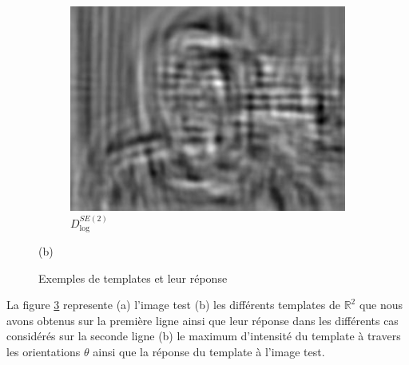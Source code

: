 \documentclass{article}
\begin{document}
\begin{figure}[h!]
\begin{subfigure}[b]{0.1\textwidth}
        \label{fig:mean and std of net44}
    \end{subfigure}
    \hspace{-1\baselineskip}
    \quad
    \begin{subfigure}[b]{0.1\textwidth}   
        \centering 
        \includegraphics[width=\textwidth]{plots/E_log_R2_conv.jpg}
        \caption{$D_{\text{log}}^{SE(2)}$}%
        
        \label{fig:mean and std of net44}
    \end{subfigure}

    {\small (b)}

    \caption[ The average and standard deviation of critical parameters ]
    {\small Exemples de templates et leur réponse} 
    \label{fig: template}
\end{figure}

La figure \ref{fig: template} represente (a) l'image test (b) les différents templates de $\mathbb{R}^2$ que nous avons obtenus sur la première ligne ainsi que leur réponse dans les différents 
cas considérés sur la seconde ligne (b) le maximum d'intensité du template à travers les orientations $\theta$ ainsi que la réponse du template à l'image test.
\end{document}
